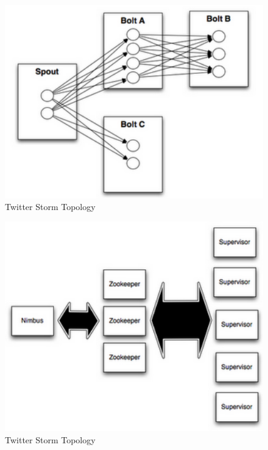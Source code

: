 \documentclass[a4paper]{article}
\begin{document}
\begin{figure}[!htbp]
\centering
\includegraphics[width=1.0\textwidth]{images/Storm-Topology.png}
\caption{Twitter Storm Topology}
\label{fig:Storm_Topology}
\end{figure}

\begin{figure}[!htbp]
\includegraphics[width=1.0\textwidth]{images/Storm-FaultTolerance.png}
\caption{Twitter Storm Topology}
\label{fig:Storm_FaultTolerance}
\end{figure}
\end{document}
